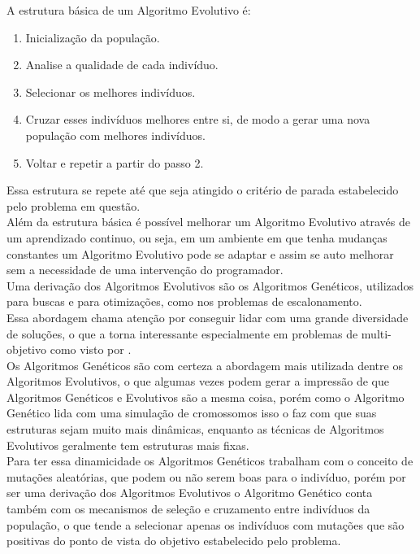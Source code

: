 \noindent A estrutura básica de um Algoritmo Evolutivo é:
\begin{enumerate}
    \item Inicialização da população.
    \item Analise a qualidade de cada indivíduo.
    \item Selecionar os melhores indivíduos.
    \item Cruzar esses indivíduos melhores entre si, de modo a gerar uma nova população com melhores indivíduos.
    \item Voltar e repetir a partir do passo 2.
\end{enumerate}
Essa estrutura se repete até que seja atingido o critério de parada estabelecido pelo problema em questão.\\
\indent Além da estrutura básica é possível melhorar um Algoritmo Evolutivo através de um aprendizado continuo, ou seja, em um ambiente em que tenha mudanças constantes um Algoritmo Evolutivo pode se adaptar e assim se auto melhorar sem a necessidade de uma intervenção do programador.\\
\indent Uma derivação dos Algoritmos Evolutivos são os Algoritmos Genéticos, utilizados para buscas e para otimizações, como nos problemas de escalonamento.\\
%
\indent Essa abordagem chama atenção por conseguir lidar com uma grande diversidade de soluções, o que a torna interessante especialmente em problemas de multi-objetivo como visto por \cite{Bagchi1999}.\\
\indent Os Algoritmos Genéticos são com certeza a abordagem mais utilizada dentre os Algoritmos Evolutivos, o que algumas vezes podem gerar a impressão de que Algoritmos Genéticos e Evolutivos são a mesma coisa, porém como o Algoritmo Genético lida com uma simulação de cromossomos isso o faz com que suas estruturas sejam muito mais dinâmicas, enquanto as técnicas de Algoritmos Evolutivos geralmente tem estruturas mais fixas.\\
%
\indent Para ter essa dinamicidade os Algoritmos Genéticos trabalham com o conceito de mutações aleatórias, que podem ou não serem boas para o indivíduo, porém por ser uma derivação dos Algoritmos Evolutivos o Algoritmo Genético conta também com os mecanismos de seleção e cruzamento entre indivíduos da população, o que tende a selecionar apenas os indivíduos com mutações que são positivas do ponto de vista do objetivo estabelecido pelo problema.\\
